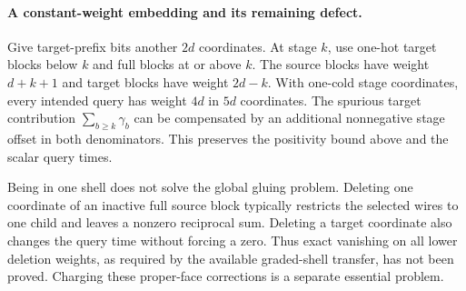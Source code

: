 \documentclass{article}
\begin{document}
\paragraph{A constant-weight embedding and its remaining defect.}
Give target-prefix bits another $2d$ coordinates.  At stage $k$, use
one-hot target blocks below $k$ and full blocks at or above $k$.
The source blocks have weight $d+k+1$ and target blocks have weight
$2d-k$.  With one-cold stage coordinates, every intended query has
weight $4d$ in $5d$ coordinates.  The spurious target contribution
$\sum_{b\geq k}\gamma_b$ can be compensated by an additional nonnegative
stage offset in both denominators.  This preserves the positivity bound
above and the scalar query times.

Being in one shell does not solve the global gluing problem.  Deleting
one coordinate of an inactive full source block typically restricts the
selected wires to one child and leaves a nonzero reciprocal sum.  Deleting
a target coordinate also changes the query time without forcing a zero.
Thus exact vanishing on all lower deletion weights, as required by the
available graded-shell transfer, has not been proved.  Charging these
proper-face corrections is a separate essential problem.
\end{document}
